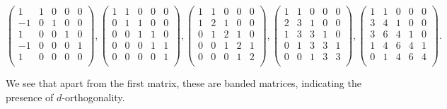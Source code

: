 \documentclass[12pt,reqno]{article}
\theoremstyle{definition}
\begin{document}
\begin{scriptsize}
$$\left(
\begin{array}{ccccc}
1&   1 & 0 &  0 & 0 \\
-1 & 0 & 1 &  0 & 0 \\
1 &  0 & 0 &  1 & 0 \\
-1 & 0 & 0 &  0 & 1  \\
1 & 0 & 0 &  0 & 0 \\
\end{array}\right),
\left(
\begin{array}{ccccc}
1&   1 & 0 &  0 & 0 \\
0 & 1 & 1 &  0 & 0 \\
0 &  0 & 1 &  1 & 0 \\
0 & 0 & 0 &  1 & 1  \\
0 & 0 & 0 &  0 & 1 \\
\end{array}\right),
\left(
\begin{array}{ccccc}
1&   1 & 0 &  0 & 0 \\
1 & 2 & 1 &  0 & 0 \\
0 &  1 & 2 &  1 & 0 \\
0 & 0 & 1 &  2 & 1  \\
0 & 0 & 0 &  1 & 2 \\
\end{array}\right),\left(
\begin{array}{ccccc}
1&   1 & 0 &  0 & 0 \\
2 & 3 & 1 &  0 & 0 \\
1 &  3 & 3 &  1 & 0 \\
0 & 1 & 3 &  3 & 1  \\
0 & 0 & 1 &  3 & 3 \\
\end{array}\right),
\left(
\begin{array}{ccccc}
1&   1 & 0 &  0 & 0 \\
3 & 4 & 1 &  0 & 0 \\
3 & 6 & 4 &  1 & 0 \\
1 & 4 & 6 &  4 & 1  \\
0 & 1 & 4 &  6 & 4 \\
\end{array}\right).$$
\end{scriptsize}
We see that apart from the first matrix, these are banded matrices, indicating the presence of $d$-orthogonality.
\end{document}
